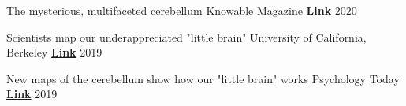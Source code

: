 
\begin{cvhonors}

  \cvhonor
    {The mysterious, multifaceted cerebellum} %
    {Knowable Magazine}
    {\href{https://knowablemagazine.org/article/mind/2020/what-does-the-cerebellum-do}{\textbf{Link}}}
    {2020}

  \cvhonor
    {Scientists map our underappreciated "little brain"} %
    {University of California, Berkeley}
    {\href{https://news.berkeley.edu/story_jump/cerebellum-map/}{\textbf{Link}}}
    {2019}
    
  \cvhonor
    {New maps of the cerebellum show how our "little brain" works} %
    {Psychology Today}
    {\href{https://www.psychologytoday.com/us/blog/the-athletes-way/201907/new-maps-the-cerebellum-show-how-our-little-brain-works}{\textbf{Link}}}
    {2019}

\end{cvhonors}